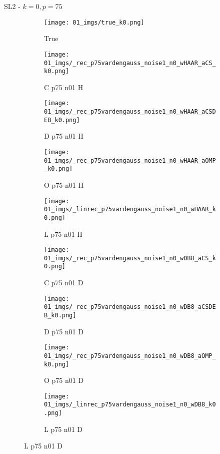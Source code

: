 \begin{frame}{SL2 - $k=0,p=75$}{}
\begin{figure}
\begin{subfigure}{0.1\textwidth}
\texttt{[image: 01\_imgs/true\_k0.png]}
\caption*{\Tiny True}
\end{subfigure}
\begin{subfigure}{0.1\textwidth}
\texttt{[image: 01\_imgs/\_rec\_p75vardengauss\_noise1\_n0\_wHAAR\_aCS\_k0.png]}
\caption*{\Tiny C p75 n01 H}
\end{subfigure}
\begin{subfigure}{0.1\textwidth}
\texttt{[image: 01\_imgs/\_rec\_p75vardengauss\_noise1\_n0\_wHAAR\_aCSDEB\_k0.png]}
\caption*{\Tiny D p75 n01 H}
\end{subfigure}
\begin{subfigure}{0.1\textwidth}
\texttt{[image: 01\_imgs/\_rec\_p75vardengauss\_noise1\_n0\_wHAAR\_aOMP\_k0.png]}
\caption*{\Tiny O p75 n01 H}
\end{subfigure}
\begin{subfigure}{0.1\textwidth}
\texttt{[image: 01\_imgs/\_linrec\_p75vardengauss\_noise1\_n0\_wHAAR\_k0.png]}
\caption*{\Tiny L p75 n01 H}
\end{subfigure}
\begin{subfigure}{0.1\textwidth}
\texttt{[image: 01\_imgs/\_rec\_p75vardengauss\_noise1\_n0\_wDB8\_aCS\_k0.png]}
\caption*{\Tiny C p75 n01 D}
\end{subfigure}
\begin{subfigure}{0.1\textwidth}
\texttt{[image: 01\_imgs/\_rec\_p75vardengauss\_noise1\_n0\_wDB8\_aCSDEB\_k0.png]}
\caption*{\Tiny D p75 n01 D}
\end{subfigure}
\begin{subfigure}{0.1\textwidth}
\texttt{[image: 01\_imgs/\_rec\_p75vardengauss\_noise1\_n0\_wDB8\_aOMP\_k0.png]}
\caption*{\Tiny O p75 n01 D}
\end{subfigure}
\begin{subfigure}{0.1\textwidth}
\texttt{[image: 01\_imgs/\_linrec\_p75vardengauss\_noise1\_n0\_wDB8\_k0.png]}
\caption*{\Tiny L p75 n01 D}
\end{subfigure}

\vspace{5pt}


\end{figure}
\end{frame}
